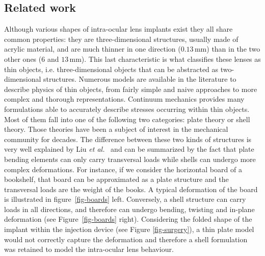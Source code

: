 \documentclass{llncs}
\begin{document}
\subsection{Related work}

Although various shapes of intra-ocular lens implants exist they all share common properties: they are three-dimensional structures, usually made of acrylic
material, and are much thinner in one direction ($0.13$\,mm) than in the two other ones ($6$ and $13$\,mm). This last characteristic is what classifies these lenses as thin objects, i.e. three-dimensional objects that can be abstracted as two-dimensional structures. Numerous models are available in the literature to describe physics of thin objects, from fairly simple and naive approaches to more complex and thorough representations. Continuum mechanics provides many formulations able to accurately describe stresses occurring within thin objects. Most of them fall into one of the following two categories: plate theory or shell theory. Those theories have been a subject of interest in the mechanical community for decades. The difference between these two kinds of structures is very well explained by Liu \textit{et al.}~\cite{Liu03} and can be summarized by the fact that plate bending elements can only carry transversal loads while shells can undergo more complex deformations. 
For instance, if we consider the horizontal board of a bookshelf, that board can be approximated as a plate structure and the transversal loads are the weight of the books. A typical deformation of the board is illustrated in figure~\ref{fig-boards} left. Conversely, a shell structure can carry loads in all directions, and therefore can undergo bending, twisting and in-plane deformation (see Figure~\ref{fig-boards} right). 
Considering the folded shape of the implant within the injection device (see Figure \ref{fig-surgery}), a thin plate model would not correctly capture the deformation and therefore a shell formulation was retained to model the intra-ocular lens behaviour. 
\end{document}
